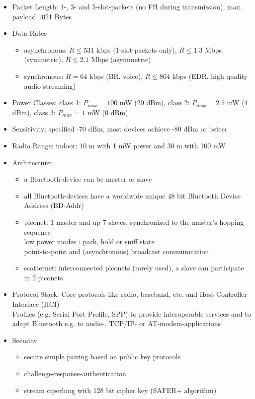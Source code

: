 \begin{itemize}
	\item Packet Length: 1-, 3- and 5-slot-packets (no FH during transmission), max. payload 1021 Bytes 
	\item Data Rates
	\begin{itemize}
		\item asynchronous:  $R \leq 531$ kbps (1-slot-packets only), $R \leq 1.3$ Mbps (symmetric), $R \leq 2.1$ Mbps (asymmetric) 
		\item synchronous:   $R = 64$ kbps (BR, voice), $R \leq 864$ kbps (EDR, high quality audio streaming) 
	\end{itemize}
	\item Power Classes:  class 1:  $P_{max} = 100$ mW (20 dBm), class 2:  $P_{max}  = 2.5$ mW (4 dBm), class 3:  $P_{max} = 1$ mW (0 dBm) 
	\item Sensitivity: specified -70 dBm, most devices achieve -80 dBm or better 
	\item Radio Range: indoor: 10 m with 1 mW power and 30 m with 100 mW 
	\item Architecture: 
	\begin{itemize}
		\item a Bluetooth-device can be master or slave 
		\item all Bluetooth-devices have a worldwide unique 48 bit Bluetooth Device Address (BD-Addr) 
		\item piconet:   1 master and up 7 slaves, synchronized to the master’s hopping sequence \\ 
		low power modes : park, hold or sniff state \\
		point-to-point and (asynchronous) broadcast communication 
		\item scatternet:  interconnected piconets (rarely used), a slave can participate in 2 piconets 
	\end{itemize}
	\item Protocol Stack: Core protocols like radio, baseband, etc. and Host Controller Interface (HCI) \\
	Profiles (e.g. Serial Port Profile, SPP) to provide interoperable services  
	and to adapt Bluetooth e.g. to audio-, TCP/IP- or AT-modem-applications 
	\item Security
	\begin{itemize}
		\item secure simple pairing based on public key protocols 
		\item challenge-response-authentication 
		\item stream ciperhing with 128 bit cipher key (SAFER+ algorithm) 

\end{itemize}
\end{itemize}
